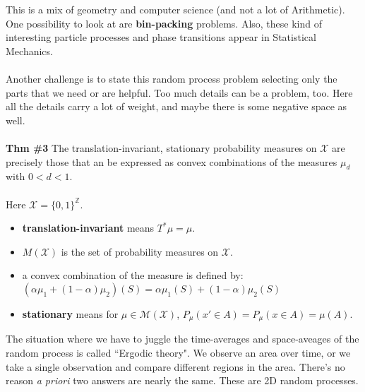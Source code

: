 \documentclass[12pt]{article}
\begin{document}
This is a mix of geometry and computer science (and not a lot of Arithmetic).  One possibility to look at are \textbf{bin-packing} problems.  Also, these kind of interesting particle processes and phase transitions appear in Statistical Mechanics.  \\ \\
Another challenge is to state this random process problem selecting only the parts that we need or are helpful.  Too much details can be a problem, too.  Here all the details carry a lot of weight, and maybe there is some negative space as well. \\ \\
\textbf{Thm \#3} The translation-invariant, stationary probability measures on $\mathcal{X}$ are precisely those that an be expressed as convex combinations of the measures $\mu_d$ with $0 < d < 1$. \\ \\
Here $\mathcal{X} = \{ 0, 1\}^{\mathbb{Z}}$.
\begin{itemize}
\item \textbf{translation-invariant} means $T^* \mu = \mu$.
\item $M(\mathcal{X})$ is the set of probability measures on $\mathcal{X}$.
\item a convex combination of the measure is defined by: $(\alpha \mu_1 + (1- \alpha)\mu_2 )(S) = \alpha \mu_1(S) + (1- \alpha)\mu_2(S)$
\item \textbf{stationary} means for $\mu \in \mathcal{M}(\mathcal{X})$,  $P_\mu(x' \in A) = P_\mu(x \in A)= \mu(A)$.
\end{itemize}
The situation where we have to juggle the time-averages and space-aveages of the random process is called ``Ergodic theory".  We observe an area over time, or we take a single observation and compare different regions in the area.  There's no reason \textit{ a priori } two answers are nearly the same.  These are 2D random processes.
\end{document}
